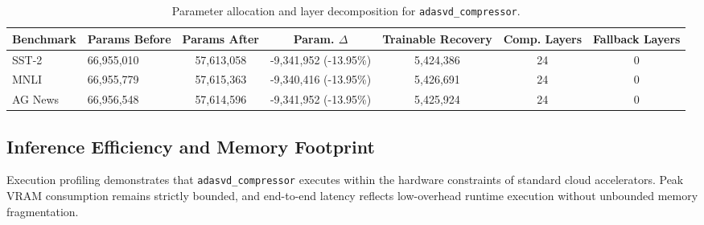 \begin{table}[t]
\centering
\small
\begin{tabular}{llccccc}
\toprule
\textbf{Benchmark} & \textbf{Params Before} & \textbf{Params After} & \textbf{Param. $\Delta$} & \textbf{Trainable Recovery} & \textbf{Comp. Layers} & \textbf{Fallback Layers} \\
\midrule
SST-2 & 66,955,010 & 57,613,058 & -9,341,952 (-13.95\%) & 5,424,386 & 24 & 0 \\
MNLI & 66,955,779 & 57,615,363 & -9,340,416 (-13.95\%) & 5,426,691 & 24 & 0 \\
AG News & 66,956,548 & 57,614,596 & -9,341,952 (-13.95\%) & 5,425,924 & 24 & 0 \\
\bottomrule
\end{tabular}
\caption{Parameter allocation and layer decomposition for \texttt{adasvd\_compressor}.}
\label{tab:params_adasvd_compressor}
\end{table}

\subsection{Inference Efficiency and Memory Footprint}
Execution profiling demonstrates that \texttt{adasvd\_compressor} executes within the hardware constraints of standard cloud accelerators. Peak VRAM consumption remains strictly bounded, and end-to-end latency reflects low-overhead runtime execution without unbounded memory fragmentation.
